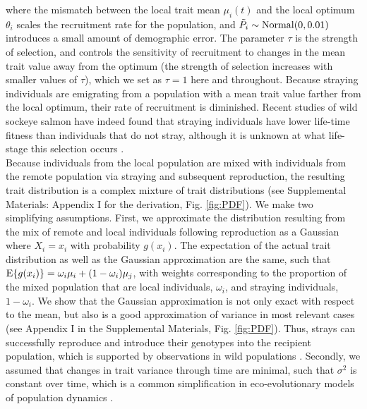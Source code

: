 \documentclass{revtex4}
\begin{document}
\noindent where the mismatch between the local trait mean $\mu_i(t)$ and the local optimum $\theta_i$ scales the recruitment rate for the population, and $\tilde{P}_i\sim {\rm Normal}(0,0.01)$ introduces a small amount of demographic error.
The parameter $\tau$ is the strength of selection, and controls the sensitivity of recruitment to changes in the mean trait value away from the optimum (the strength of selection increases with smaller values of $\tau$), which we set as $\tau=1$ here and throughout.
Because straying individuals are emigrating from a population with a mean trait value farther from the local optimum, their rate of recruitment is diminished.
Recent studies of wild sockeye salmon have indeed found that straying individuals have lower life-time fitness than individuals that do not stray, although it is unknown at what life-stage this selection occurs \citep{Peterson:2014gy}.
\\


Because individuals from the local population are mixed with individuals from the remote population via straying and subsequent reproduction, the resulting trait distribution is a complex mixture of trait distributions (see Supplemental Materials: Appendix I for the derivation, Fig. \ref{fig:PDF}).
We make two simplifying assumptions.
First, we approximate the distribution resulting from the mix of remote and local individuals following reproduction as a Gaussian where $X_i=x_i$ with probability $g(x_i)$.
The expectation of the actual trait distribution as well as the Gaussian approximation are the same, such that ${\rm E}\{g(x_i)\} = \omega_i\mu_i + (1-\omega_i)\mu_j$, with weights corresponding to the proportion of the mixed population that are local individuals, $\omega_i$, and straying individuals, $1-\omega_i$.
We show that the Gaussian approximation is not only exact with respect to the mean, but also is a good approximation of variance in most relevant cases (see Appendix I in the Supplemental Materials, Fig. \ref{fig:PDF}).
Thus, strays can successfully reproduce and introduce their genotypes into the recipient population, which is supported by observations in wild populations \citep{Jasper:2013cc}.
Secondly, we assumed that changes in trait variance through time are minimal, such that $\sigma^2$ is constant over time, which is a common simplification in eco-evolutionary models of population dynamics \citep{Lande:1976ga,Schreiber:2011wx,Gilbert:2014ee,Gibert:2015kc}.
\end{document}
